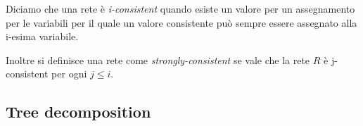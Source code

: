 \documentclass[a4paper, 11pt]{article}
\begin{document}
Diciamo che una rete è \textit{i-consistent} quando esiste un valore per un assegnamento per le variabili per il quale un valore consistente può sempre essere assegnato alla i-esima variabile.

Inoltre si definisce una rete come \textit{strongly-consistent} se vale che la rete $R$ è j-consistent per ogni $j \leq i$.

\subsection{Tree decomposition}
\end{document}
